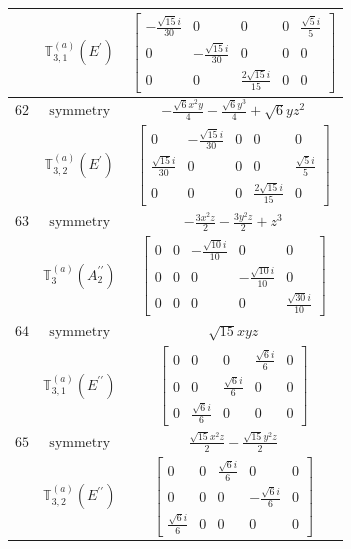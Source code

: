 \documentclass[fleqn,8pt,landscape]{jsarticle}
\begin{document}
\begin{longtable}{ccc}
$  $ & $ \mathbb{T}_{3,1}^{(a)}(E^{\prime}) $ & $ \begin{bmatrix} - \frac{\sqrt{15} i}{30} & 0 & 0 & 0 & \frac{\sqrt{5} i}{5} \\ 0 & - \frac{\sqrt{15} i}{30} & 0 & 0 & 0 \\ 0 & 0 & \frac{2 \sqrt{15} i}{15} & 0 & 0 \end{bmatrix} $ \\ \hline
$ 62 $ & $ \text{symmetry} $ & $ - \frac{\sqrt{6} x^{2} y}{4} - \frac{\sqrt{6} y^{3}}{4} + \sqrt{6} y z^{2} $ \\
$  $ & $ \mathbb{T}_{3,2}^{(a)}(E^{\prime}) $ & $ \begin{bmatrix} 0 & - \frac{\sqrt{15} i}{30} & 0 & 0 & 0 \\ \frac{\sqrt{15} i}{30} & 0 & 0 & 0 & \frac{\sqrt{5} i}{5} \\ 0 & 0 & 0 & \frac{2 \sqrt{15} i}{15} & 0 \end{bmatrix} $ \\ \hline
$ 63 $ & $ \text{symmetry} $ & $ - \frac{3 x^{2} z}{2} - \frac{3 y^{2} z}{2} + z^{3} $ \\
$  $ & $ \mathbb{T}_{3}^{(a)}(A_{2}^{\prime\prime}) $ & $ \begin{bmatrix} 0 & 0 & - \frac{\sqrt{10} i}{10} & 0 & 0 \\ 0 & 0 & 0 & - \frac{\sqrt{10} i}{10} & 0 \\ 0 & 0 & 0 & 0 & \frac{\sqrt{30} i}{10} \end{bmatrix} $ \\ \hline
$ 64 $ & $ \text{symmetry} $ & $ \sqrt{15} x y z $ \\
$  $ & $ \mathbb{T}_{3,1}^{(a)}(E^{\prime\prime}) $ & $ \begin{bmatrix} 0 & 0 & 0 & \frac{\sqrt{6} i}{6} & 0 \\ 0 & 0 & \frac{\sqrt{6} i}{6} & 0 & 0 \\ 0 & \frac{\sqrt{6} i}{6} & 0 & 0 & 0 \end{bmatrix} $ \\ \hline
$ 65 $ & $ \text{symmetry} $ & $ \frac{\sqrt{15} x^{2} z}{2} - \frac{\sqrt{15} y^{2} z}{2} $ \\
$  $ & $ \mathbb{T}_{3,2}^{(a)}(E^{\prime\prime}) $ & $ \begin{bmatrix} 0 & 0 & \frac{\sqrt{6} i}{6} & 0 & 0 \\ 0 & 0 & 0 & - \frac{\sqrt{6} i}{6} & 0 \\ \frac{\sqrt{6} i}{6} & 0 & 0 & 0 & 0 \end{bmatrix} $ \\ \hline

\end{longtable}
\end{document}
